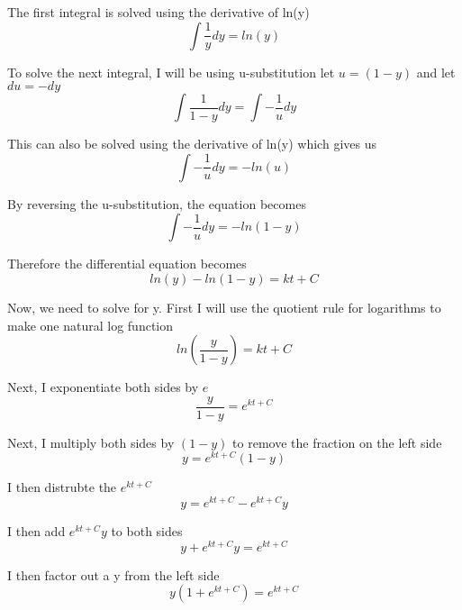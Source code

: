 \documentclass[12pt]{article}
\begin{document}
The first integral is solved using the derivative of ln(y)
\begin{equation*}
\int \frac{1}{y}dy = ln(y) 
\end{equation*}

To solve the next integral, I will be using u-substitution
let $u = (1 - y)$ and let $du = -dy$
\begin{equation*}
\int \frac{1}{1-y}dy = \int -\frac{1}{u}dy
\end{equation*}

This can also be solved using the derivative of ln(y) which gives us
\begin{equation*}
\int -\frac{1}{u}dy = -ln(u)
\end{equation*}

By reversing the u-substitution, the equation becomes
\begin{equation*}
\int -\frac{1}{u}dy = -ln(1-y)
\end{equation*}

Therefore the differential equation becomes
\begin{equation*}
ln(y) - ln(1-y) = kt + C
\end{equation*}

Now, we need to solve for y. First I will use the quotient rule for logarithms to make one natural log function
\begin{equation*}
ln(\frac{y}{1-y}) = kt + C
\end{equation*}

Next, I exponentiate both sides by $e$
\begin{equation*}
\frac{y}{1-y} = e^{kt + C}
\end{equation*}

Next, I multiply both sides by $(1 - y)$ to remove the fraction on the left side
\begin{equation*}
y = e^{kt + C}(1-y)
\end{equation*}

I then distrubte the $e^{kt + C}$
\begin{equation*}
y = e^{kt + C} - e^{kt + C}y
\end{equation*}

I then add $e^{kt + C}y$ to both sides  
\begin{equation*}
y + e^{kt + C}y = e^{kt + C} 
\end{equation*}

I then factor out a y from the left side
\begin{equation*}
y(1 + e^{kt + C}) = e^{kt + C} 
\end{equation*}
\end{document}
